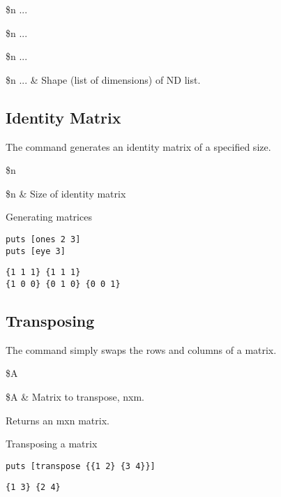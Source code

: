 \documentclass{article}
\begin{document}
\begin{syntax}
 \$n ...
\end{syntax}
\begin{syntax}
 \$n ...
\end{syntax}
\begin{syntax}
 \$n ...
\end{syntax}
\begin{args}
\$n ... & Shape (list of dimensions) of ND list. 
\end{args}

\subsection{Identity Matrix}
The command  generates an identity matrix of a specified size.
\begin{syntax}
 \$n
\end{syntax}
\begin{args}
\$n  & Size of identity matrix 
\end{args}

\begin{example}{Generating matrices}
\begin{lstlisting}
puts [ones 2 3]
puts [eye 3]
\end{lstlisting}
\tcblower
\begin{lstlisting}
{1 1 1} {1 1 1}
{1 0 0} {0 1 0} {0 0 1}
\end{lstlisting}
\end{example}
\clearpage
\subsection{Transposing}
The command  simply swaps the rows and columns of a matrix. 
\begin{syntax}
 \$A
\end{syntax}
\begin{args}
\$A & Matrix to transpose, nxm.
\end{args}
Returns an mxn matrix.
\begin{example}{Transposing a matrix}
\begin{lstlisting}
puts [transpose {{1 2} {3 4}}]
\end{lstlisting}
\tcblower
\begin{lstlisting}
{1 3} {2 4}
\end{lstlisting}
\end{example}
\end{document}
